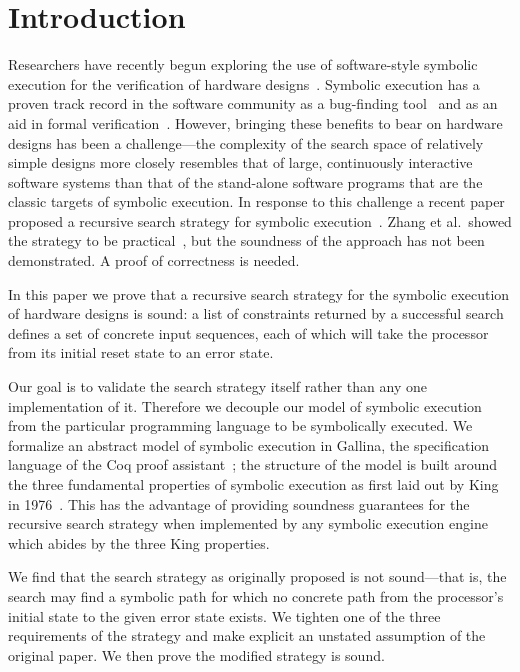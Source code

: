 \section{Introduction}

Researchers have recently begun exploring the use of software-style symbolic execution for the
verification of hardware designs~\cite{mukherjee2015hardware,liu2009star}. Symbolic execution has a proven track record in the software community as a
bug-finding tool~\cite{?} and as an aid in formal
verification~\cite{?}. However, bringing these benefits to bear on hardware
designs has been a challenge---the complexity of the search space of relatively
simple designs more closely resembles that of large, continuously interactive
software systems than that of the stand-alone software programs that are the classic
targets of symbolic execution. In response to this challenge a recent paper proposed a recursive
search strategy for symbolic execution~\cite{zhang2018recursive}. Zhang et
al.~showed the strategy to be
practical~\cite{zhang2018end}, but the soundness of the approach has not been
demonstrated. A proof of correctness is needed.

In this paper we prove that a recursive search strategy for the
symbolic execution of hardware designs is sound: a list of
constraints returned by a successful search defines a set of concrete input
sequences, each of which will take the processor from its initial reset state to
an error state.

Our goal is to validate the search strategy itself rather than any one implementation
of it. Therefore we decouple our model of symbolic execution from the particular
programming language to be symbolically executed. We formalize an abstract model of symbolic
execution in Gallina, the specification language of the Coq proof
assistant~\cite{?}; the structure of the model is built
around the three fundamental properties of symbolic execution as first laid out
by King in 1976~\cite{}. This has the advantage of providing soundness
guarantees for the recursive search strategy when implemented by any symbolic
execution engine which abides by the three King properties.


We find that the search strategy as originally proposed is not sound---that is, the
search may find a symbolic path for which no concrete path from the processor's initial state
to the given error state exists. We tighten one of the three
requirements of the strategy and make explicit an unstated assumption of the
original paper. We then prove the modified strategy is sound.

